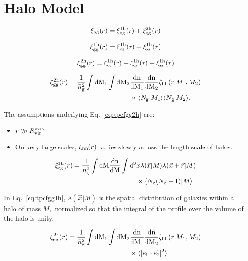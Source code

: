 \documentclass[fleqn,usenatbib]{mnras}
\newcommand{\beq}{\begin{eqnarray}}
\newcommand{\eeq}{\end{eqnarray}}
\newcommand{\bit}{\begin{itemize}}
\newcommand{\eit}{\end{itemize}}
\newcommand{\tpcf}[1]{\xi_{\rm #1}}
\newcommand{\tpcftwo}[2]{\xi_{\rm #1}^{\rm #2}}
\newcommand{\dd}{\rm d}
\newcommand{\mean}[1]{\langle #1 \rangle}
\newcommand{\meantwo}[2]{\langle #1 \vert #2 \rangle}
\begin{document}
\section{Halo Model}

\beq
\tpcf{gg}(r) = \tpcftwo{gg}{1h}(r) + \tpcftwo{gg}{2h}(r)
\eeq

\beq
\tpcftwo{gg}{1h}(r) = \tpcftwo{cs}{1h}(r) + \tpcftwo{ss}{1h}(r) 
\eeq

\beq
\tpcftwo{gg}{2h}(r) =  \tpcftwo{cc}{1h}(r) + \tpcftwo{cs}{1h}(r) + \tpcftwo{ss}{1h}(r) 
\eeq

\begin{align}
\label{eq:tpcfgg2h}
\begin{split}
\tpcftwo{gg}{2h}(r) =   \frac{1}{\bar{n}_{\rm g}^{2}}\int\dd M_1 \int\dd M_2 & \frac{\rm dn}{\dd M_1}\frac{\rm dn}{\dd M_2} \tpcf{hh}(r\vert M_1, M_2) \\& \times  \meantwo{N_{\rm g}}{M_1} \meantwo{N_{\rm g}}{M_2}. 
\end{split}
\end{align}

The assumptions underlying Eq.~\ref{eq:tpcfgg2h} are:
\bit
\item $r\gg R_{\rm vir}^{\rm max}$
\item On very large scales, $\tpcf{hh}(r)$ varies slowly across the length scale of halos. 
\eit

\begin{align}
\label{eq:tpcfgg1h}
\begin{split}
\tpcftwo{gg}{1h}(r) =  \frac{1}{\bar{n}_{\rm g}^{2}} \int\dd M \frac{\rm dn}{\dd M} \int\dd^{3}& x\lambda(\vec{x}\vert M)\lambda(\vec{x}+\vec{r}\vert M)\\ & \times  \meantwo{N_{\rm g}(N_{\rm g}-1)}{M}
\end{split}
\end{align}

In Eq.~\ref{eq:tpcfgg1h}, $\lambda(\vec{x}\vert M)$ is the spatial distribution of galaxies within a halo of mass $M,$ normalized so that the integral of the profile over the volume of the halo is unity.

\begin{align}
\label{eq:tpcfee2h}
\begin{split}
\tpcftwo{ee}{2h}(r) =   \frac{1}{\bar{n}_{\rm g}^{2}}\int\dd M_1 \int\dd M_2 & \frac{\rm dn}{\dd M_1}\frac{\rm dn}{\dd M_2} \tpcf{hh}(r\vert M_1, M_2) \\& \times  \mean{\vert\vec{e}_{1}\cdot\vec{e}_{2}\vert^{2}}
\end{split}
\end{align}
\end{document}
